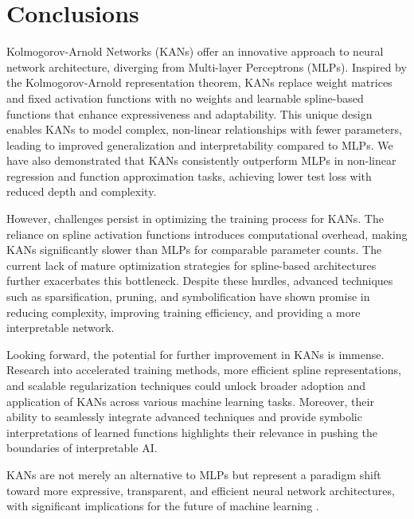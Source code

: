 \section{Conclusions}

Kolmogorov-Arnold Networks (KANs) offer an innovative approach to neural network architecture, diverging from Multi-layer Perceptrons (MLPs). Inspired by the Kolmogorov-Arnold representation theorem, KANs replace weight matrices and fixed activation functions with no weights and learnable spline-based functions that enhance expressiveness and adaptability. This unique design enables KANs to model complex, non-linear relationships with fewer parameters, leading to improved generalization and interpretability compared to MLPs. We have also demonstrated that KANs consistently outperform MLPs in non-linear regression and function approximation tasks, achieving lower test loss with reduced depth and complexity.

However, challenges persist in optimizing the training process for KANs. The reliance on spline activation functions introduces computational overhead, making KANs significantly slower than MLPs for comparable parameter counts. The current lack of mature optimization strategies for spline-based architectures further exacerbates this bottleneck. Despite these hurdles, advanced techniques such as sparsification, pruning, and symbolification have shown promise in reducing complexity, improving training efficiency, and providing a more interpretable network.

Looking forward, the potential for further improvement in KANs is immense. Research into accelerated training methods, more efficient spline representations, and scalable regularization techniques could unlock broader adoption and application of KANs across various machine learning tasks. Moreover, their ability to seamlessly integrate advanced techniques and provide symbolic interpretations of learned functions highlights their relevance in pushing the boundaries of interpretable AI.

KANs are not merely an alternative to MLPs but represent a paradigm shift toward more expressive, transparent, and efficient neural network architectures, with significant implications for the future of machine learning \cite{KAN,book1NAML,book2NAML,KArevisited,KAtheorem,bezier,kan_intro}.

